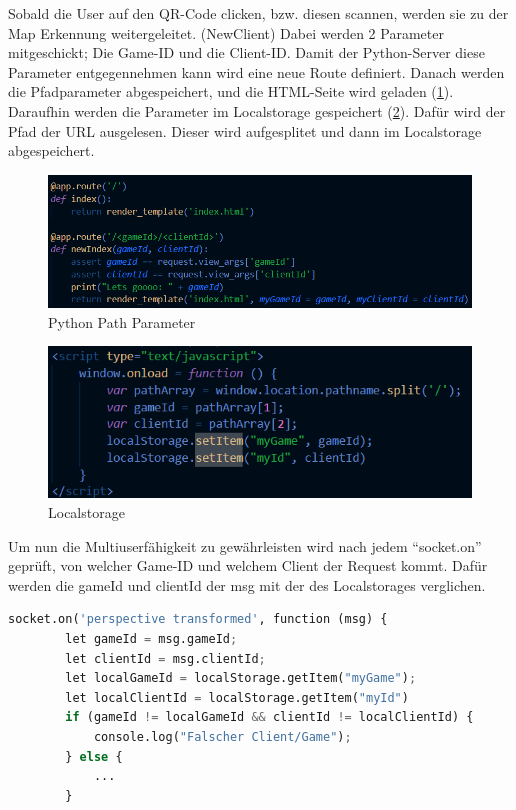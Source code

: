 Sobald die User auf den QR-Code clicken, bzw. diesen scannen, werden sie zu der Map Erkennung weitergeleitet. (NewClient)
Dabei werden 2 Parameter mitgeschickt; Die Game-ID und die Client-ID. Damit der Python-Server diese Parameter entgegennehmen kann wird eine neue Route definiert. Danach werden die Pfadparameter abgespeichert,
und die HTML-Seite wird geladen (\ref*{PythonParam}). Daraufhin werden die Parameter im Localstorage gespeichert (\ref*{localstorage_map}). Dafür wird der Pfad der URL ausgelesen. Dieser wird aufgesplitet und dann im Localstorage abgespeichert.
\begin{figure}[H]
    \centering
    \includegraphics[scale=0.85]{pics/python_Params.png}
    \caption{Python Path Parameter}
    \label{PythonParam}
\end{figure}



\begin{figure}[H]
    \centering
    \includegraphics[scale=0.85]{pics/localStorage.png}
    \caption{Localstorage}
    \label{localstorage_map}
\end{figure}

Um nun die Multiuserfähigkeit zu gewährleisten wird nach jedem ``socket.on'' geprüft,
von welcher Game-ID und welchem Client der Request kommt. Dafür werden die gameId und clientId der msg mit der des Localstorages verglichen.

\begin{lstlisting}[language=Python,caption= Socket.on Beispielüberprüfung]
    socket.on('perspective transformed', function (msg) {
        let gameId = msg.gameId;
        let clientId = msg.clientId;
        let localGameId = localStorage.getItem("myGame");
        let localClientId = localStorage.getItem("myId")
        if (gameId != localGameId && clientId != localClientId) {
            console.log("Falscher Client/Game");
        } else {
            ...
        }
\end{lstlisting}

